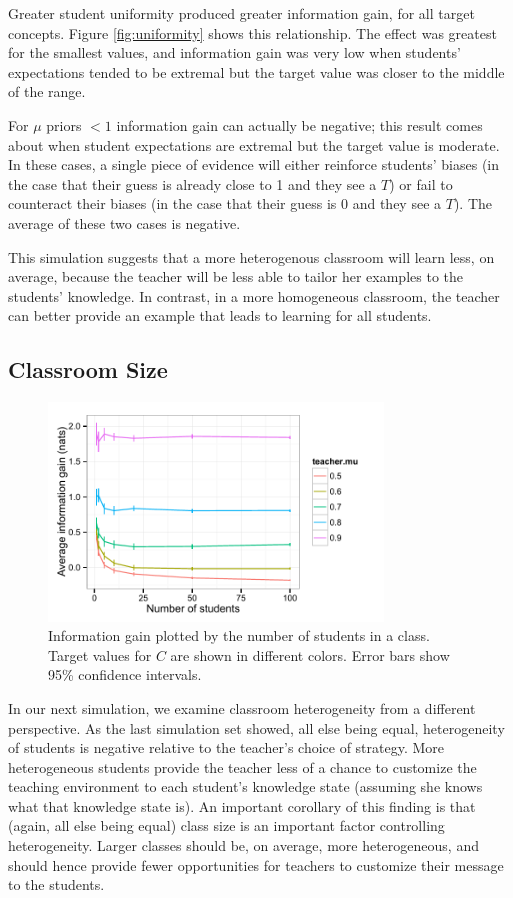 \documentclass[10pt,letterpaper]{article}
\begin{document}
Greater student uniformity produced greater information gain, for all target concepts. Figure \ref{fig:uniformity} shows this relationship. The effect was greatest for the smallest values, and information gain was very low when students' expectations tended to be extremal but the target value was closer to the middle of the range. 

For $\mu$ priors $< 1$ information gain can actually be negative; this result comes about when student expectations are extremal but the target value is moderate. In these cases, a single piece of evidence will either reinforce students' biases (in the case that their guess is already close to 1 and they see a $T$) or fail to counteract their biases (in the case that their guess is 0 and they see a $T$). The average of these two cases is negative.

This simulation suggests that a more heterogenous classroom will learn less, on average, because the teacher will be less able to tailor her examples to the students' knowledge. In contrast, in a more homogeneous classroom, the teacher can better provide an example that leads to learning for all students. 

\subsection{Classroom Size}

\begin{figure}[t]
\begin{center}
\includegraphics[width=3.5in]{figures/class_size.pdf}
\end{center}
\caption{\label{fig:class} Information gain plotted by the number of students in a class. Target values for $C$ are shown in different colors. Error bars show 95\% confidence intervals.}
\end{figure}

In our next simulation, we examine classroom heterogeneity from a different perspective. As the last simulation set showed, all else being equal, heterogeneity of students is negative relative to the teacher's choice of strategy. More heterogeneous students provide the teacher less of a chance to customize the teaching environment to each student's knowledge state (assuming she knows what that knowledge state is). An important corollary of this finding is that (again, all else being equal) class size is an important factor controlling heterogeneity. Larger classes should be, on average, more heterogeneous, and should hence provide fewer opportunities for teachers to customize their message to the students. 
\end{document}
